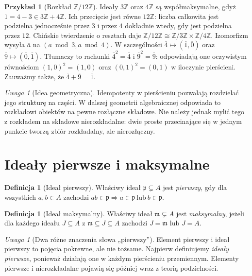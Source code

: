 \documentclass[11pt,a4paper,openany]{report}
\numberwithin{equation}{section}
\theoremstyle{plain}
\theoremstyle{definition}
\newtheorem{definicja}[twierdzenie]{Definicja}
\newtheorem{przyklad}[twierdzenie]{Przykład}
\theoremstyle{remark}
\newtheorem{uwaga}[twierdzenie]{Uwaga}
\newcommand{\Z}{\mathbb Z}
\begin{document}
\begin{przyklad}[Rozkład $\Z/12\Z$]
Ideały $3\Z$ oraz $4\Z$ są współmaksymalne, gdyż
$1=4-3\in3\Z+4\Z$. Ich przecięcie jest równe $12\Z$:
liczba całkowita jest podzielna jednocześnie przez $3$ i przez $4$
dokładnie wtedy, gdy jest podzielna przez $12$.
Chińskie twierdzenie o resztach daje
$\Z/12\Z\cong\Z/3\Z\times\Z/4\Z$.
Izomorfizm wysyła $\overline a$ na
$(a\bmod 3,a\bmod 4)$.
W szczególności $\overline4\mapsto(\overline1,\overline0)$
oraz $\overline9\mapsto(\overline0,\overline1)$.
Tłumaczy to rachunki $\overline4^2=\overline4$ i
$\overline9^2=\overline9$: odpowiadają one oczywistym równościom
$(1,0)^2=(1,0)$ oraz $(0,1)^2=(0,1)$ w iloczynie pierścieni.
Zauważmy także, że $\overline4+\overline9=\overline1$.
\end{przyklad}

\begin{uwaga}[Idea geometryczna]
Idempotenty w pierścieniu pozwalają rozdzielać jego strukturę na
części. W dalszej geometrii algebraicznej odpowiada to rozkładowi
obiektów na pewne rozłączne składowe. Nie należy jednak mylić tego
z rozkładem na składowe nierozkładalne: dwie proste przecinające się
w jednym punkcie tworzą zbiór rozkładalny, ale nierozłączny.
\end{uwaga}

\section{Ideały pierwsze i maksymalne}

\begin{definicja}[Ideał pierwszy]
Właściwy ideał $\mathfrak p\subsetneq A$ jest \emph{pierwszy}, gdy
dla wszystkich $a,b\in A$ zachodzi
$ab\in\mathfrak p\Rightarrow a\in\mathfrak p\ \text{lub}\ b\in\mathfrak p$.
\end{definicja}

\begin{definicja}[Ideał maksymalny]
Właściwy ideał $\mathfrak m\subsetneq A$ jest \emph{maksymalny},
jeżeli dla każdego ideału $J\subseteq A$ z
$\mathfrak m\subseteq J\subseteq A$ zachodzi
$J=\mathfrak m$ lub $J=A$.
\end{definicja}

\begin{uwaga}[Dwa różne znaczenia słowa „pierwszy”]
Element pierwszy i ideał pierwszy to pojęcia pokrewne, ale nie tożsame.
Najpierw definiujemy \emph{ideały pierwsze}, ponieważ działają one
w każdym pierścieniu przemiennym. Elementy pierwsze i nierozkładalne
pojawią się później wraz z teorią podzielności.
\end{uwaga}
\end{document}

